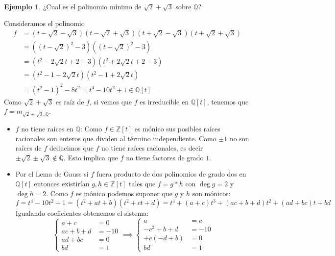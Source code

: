 \documentclass[10pt, spanish]{report}
\theoremstyle{definition}
\newtheorem*{ej}{Ejemplo}
\theoremstyle{custom}
\theoremstyle{remark}
\newcommand{\Z}{\mathbb{Z}}
\newcommand{\Q}{\mathbb{Q}}
\begin{document}
\begin{ej}
    ¿Cual es el polinomio mínimo de $\sqrt{2}+\sqrt{3}$ sobre $\Q$?

    Consideramos el polinomio
    \begin{align*}
        f&=(t-\sqrt{2}-\sqrt{3})(t-\sqrt{2}+\sqrt{3})(t+\sqrt{2}-\sqrt{3})(t+\sqrt{2}+\sqrt{3})\\
         &=((t-\sqrt{2})^2-3) ((t+\sqrt{2})^2-3)\\
         &=(t^2-2\sqrt{2}t+2-3)(t^2+2\sqrt{2}t+2-3)\\
         &=(t^2-1-2\sqrt{2}t)(t^2-1+2\sqrt{2}t)\\
         &=(t^2-1)^2-8t^2=t^4-10t^2+1\in\Q[t]
    \end{align*}
    Como $\sqrt{2}+\sqrt{3}$ es raíz de $f$, si vemos que $f$ es irreducible en
    $\Q[t]$, tenemos que $f=m_{\sqrt{2}+\sqrt{3},\Q}$.
    \begin{itemize}
        \item $f$ no tiene raíces en $\Q$: Como $f\in\Z[t]$ es mónico sus
            posibles raíces racionales son enteros que dividen al término
            independiente. Como $\pm1$ no son raíces de $f$ deducimos que $f$ no
            tiene raíces racionales, es decir $\pm\sqrt{2}\pm\sqrt{3}\not\in\Q$.
            Esto implica que $f$ no tiene factores de grado $1$.
        \item Por el Lema de Gauss si $f$ fuera producto de dos polinomios de
            grado dos en $\Q[t]$ entonces existirían $g,h\in\Z[t]$ tales que
            $f=g*h$ con $\deg{g}=2$ y $\deg{h}=2$. Como $f$ es mónico podemos
            suponer que $g$ y $h$ son mónicos:
            \[f=t^4-10t^2+1=(t^2+at+b)(t^2+ct+d)=t^4+(a+c)t^3+(ac+b+d)t^2+(ad+bc)t+bd\]
            Igualando coeficientes obtenemos el sistema:
            \[
                \begin{cases}
                    a+c &= 0\\
                    ac+b+d &= -10\\
                    ad+bc&=0\\
                    bd&=1
                \end{cases}
                \implies
                \begin{cases}
                    a&=c\\
                    -c^2+b+d&=-10\\
                    +c(-d+b)&=0\\
                    bd&=1
                \end{cases}
\]
\end{itemize}
\end{ej}
\end{document}
